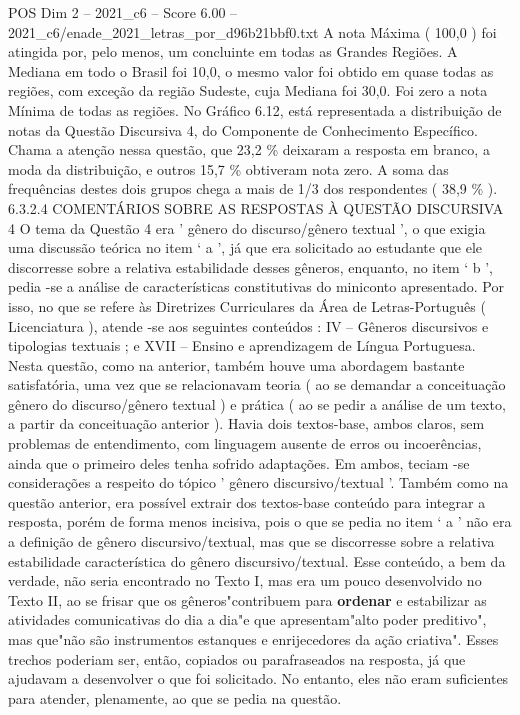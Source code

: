 \begin{textsample}{POS Dim 2 – 2021\_c6 – Score 6.00 – 2021\_c6/enade\_2021\_letras\_por\_d96b21bbf0.txt}
A nota Máxima ( 100,0 ) foi atingida por, pelo menos, um concluinte em todas as Grandes Regiões.
A Mediana em todo o Brasil foi 10,0, o mesmo valor foi obtido em quase todas as regiões, com exceção da região Sudeste, cuja Mediana foi 30,0.
Foi zero a nota Mínima de todas as regiões.
No Gráfico 6.12, está representada a distribuição de notas da Questão Discursiva 4, do Componente de Conhecimento Específico.
Chama a atenção nessa questão, que 23,2 \% deixaram a resposta em branco, a moda da distribuição, e outros 15,7 \% obtiveram nota zero.
A soma das frequências destes dois grupos chega a mais de 1/3 dos respondentes ( 38,9 \% ). 6.3.2.4 COMENTÁRIOS SOBRE AS RESPOSTAS À QUESTÃO DISCURSIVA 4 O tema da Questão 4 era ' gênero do discurso/gênero textual ', o que exigia uma discussão teórica no item ‘ a ’, já que era solicitado ao estudante que ele discorresse sobre a relativa estabilidade desses gêneros, enquanto, no item ‘ b ’, pedia -se a análise de características constitutivas do miniconto apresentado.
Por isso, no que se refere às Diretrizes Curriculares da Área de Letras-Português ( Licenciatura ), atende -se aos seguintes conteúdos : IV – Gêneros discursivos e tipologias textuais ; e XVII – Ensino e aprendizagem de Língua Portuguesa.
Nesta questão, como na anterior, também houve uma abordagem bastante satisfatória, uma vez que se relacionavam teoria ( ao se demandar a conceituação gênero do discurso/gênero textual ) e prática ( ao se pedir a análise de um texto, a partir da conceituação anterior ).
Havia dois textos-base, ambos claros, sem problemas de entendimento, com linguagem ausente de erros ou incoerências, ainda que o primeiro deles tenha sofrido adaptações.
Em ambos, teciam -se considerações a respeito do tópico ' gênero discursivo/textual '.
Também como na questão anterior, era possível extrair dos textos-base conteúdo para integrar a resposta, porém de forma menos incisiva, pois o que se pedia no item ‘ a ’ não era a definição de gênero discursivo/textual, mas que se discorresse sobre a relativa estabilidade característica do gênero discursivo/textual.
Esse conteúdo, a bem da verdade, não seria encontrado no Texto I, mas era um pouco desenvolvido no Texto II, ao se frisar que os gêneros"contribuem para \textbf{ordenar} e estabilizar as atividades comunicativas do dia a dia"e que apresentam"alto poder preditivo", mas que"não são instrumentos estanques e enrijecedores da ação criativa".
Esses trechos poderiam ser, então, copiados ou parafraseados na resposta, já que ajudavam a desenvolver o que foi solicitado.
No entanto, eles não eram suficientes para atender, plenamente, ao que se pedia na questão.

\end{textsample}
